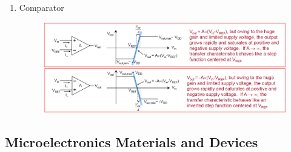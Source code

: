 \documentclass{article}
\begin{document}
\begin{enumerate}
\begin{figure}[!h]
    \end{figure}
    \item Comparator
    \begin{figure}[!h]
        \centering
        \includegraphics[width=0.75\linewidth]{image/comparator.png}
    \end{figure}
    
    




    
\end{enumerate}


\newpage
\subsection{Microelectronics Materials and Devices}
\end{document}
